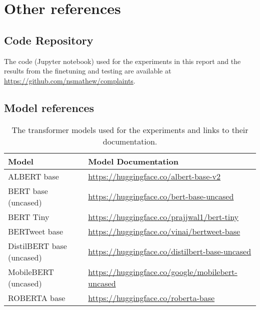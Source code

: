 
\chapter{Other references}

\section{Code Repository}
The code (Jupyter notebook) used for the experiments in this report and the results from the finetuning and testing are available at \url{https://github.com/nsmathew/complaints}.

\section{Model references}

\begin{table}[ht]
    \captionsetup{font=small}
    \centering
    \begin{tabularx}{\textwidth}{|l|X|}
        \hline
        \rowcolor[gray]{0.7}
        \textbf{Model}            & \textbf{Model Documentation}                                   \\
        \hline

        ALBERT base               & \small{\url{https://huggingface.co/albert-base-v2}}            \\
        \hline
        BERT base (uncased)       & \small{\url{https://huggingface.co/bert-base-uncased}}         \\
        \hline
        BERT Tiny                 & \small{\url{https://huggingface.co/prajjwal1/bert-tiny}}       \\
        \hline
        BERTweet base             & \small{\url{https://huggingface.co/vinai/bertweet-base}}       \\
        \hline
        DistilBERT base (uncased) & \small{\url{https://huggingface.co/distilbert-base-uncased}}   \\
        \hline
        MobileBERT (uncased)      & \small{\url{https://huggingface.co/google/mobilebert-uncased}} \\
        \hline
        ROBERTA base              & \small{\url{https://huggingface.co/roberta-base}}              \\
        \hline
    \end{tabularx}
    \caption{The transformer models used for the experiments and links to their documentation.}
    \label{tab: apdxb_model_doc}
\end{table}

